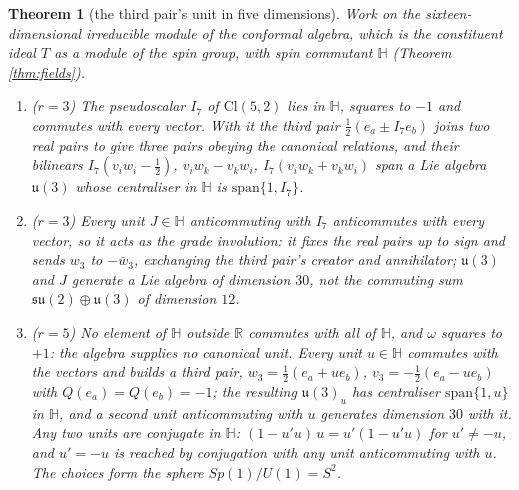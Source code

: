 \documentclass[11pt]{article}
\newtheorem{theorem}{Theorem}[section]
\theoremstyle{definition}
\newcommand{\Cl}{\mathrm{Cl}}
\newcommand{\R}{\mathbb{R}}
\newcommand{\HH}{\mathbb{H}}
\newcommand{\su}{\mathfrak{su}}
\newcommand{\uu}{\mathfrak{u}}
\begin{document}
\begin{theorem}[the third pair's unit in five dimensions]\label{thm:unit}
Work on the sixteen-dimensional irreducible module of the conformal algebra, which is the constituent ideal $T$ as a module of the spin group, with spin commutant $\HH$ (Theorem \ref{thm:fields}).
\begin{enumerate}
\item[(i)] ($r = 3$) The pseudoscalar $I_{7}$ of $\Cl(5,2)$ lies in $\HH$, squares to $-1$ and commutes with every vector. With it the third pair $\tfrac{1}{2}(e_{a} \pm I_{7}e_{b})$ joins two real pairs to give three pairs obeying the canonical relations, and their bilinears $I_{7}(v_{i}w_{i} - \tfrac{1}{2})$, $v_{i}w_{k} - v_{k}w_{i}$, $I_{7}(v_{i}w_{k} + v_{k}w_{i})$ span a Lie algebra $\uu(3)$ whose centraliser in $\HH$ is $\mathrm{span}\{1, I_{7}\}$.
\item[(ii)] ($r = 3$) Every unit $J \in \HH$ anticommuting with $I_{7}$ anticommutes with every vector, so it acts as the grade involution: it fixes the real pairs up to sign and sends $w_{3}$ to $-\bar{w}_{3}$, exchanging the third pair's creator and annihilator; $\uu(3)$ and $J$ generate a Lie algebra of dimension $30$, not the commuting sum $\su(2) \oplus \uu(3)$ of dimension $12$.
\item[(iii)] ($r = 5$) No element of $\HH$ outside $\R$ commutes with all of $\HH$, and $\omega$ squares to $+1$: the algebra supplies no canonical unit. Every unit $u \in \HH$ commutes with the vectors and builds a third pair, $w_{3} = \tfrac{1}{2}(e_{a} + ue_{b})$, $v_{3} = -\tfrac{1}{2}(e_{a} - ue_{b})$ with $Q(e_{a}) = Q(e_{b}) = -1$; the resulting $\uu(3)_{u}$ has centraliser $\mathrm{span}\{1, u\}$ in $\HH$, and a second unit anticommuting with $u$ generates dimension $30$ with it. Any two units are conjugate in $\HH$: $(1 - u'u)\,u = u'(1 - u'u)$ for $u' \neq -u$, and $u' = -u$ is reached by conjugation with any unit anticommuting with $u$. The choices form the sphere $Sp(1)/U(1) = S^{2}$.
\end{enumerate}
\end{theorem}
\end{document}
